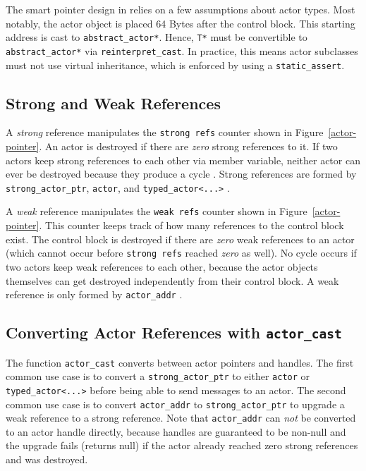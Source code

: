The smart pointer design in \lib relies on a few assumptions about actor types. Most notably, the actor object is placed 64 Bytes after the control block. This starting address is cast to \lstinline^abstract_actor*^. Hence, \lstinline^T*^ must be convertible to \lstinline^abstract_actor*^ via \lstinline^reinterpret_cast^. In practice, this means actor subclasses must not use virtual inheritance, which is enforced by using a \lstinline^static_assert^.

\subsection{Strong and Weak References}

A \emph{strong} reference manipulates the \lstinline^strong refs^ counter shown in Figure~\ref{actor-pointer}. An actor is destroyed if there are \emph{zero} strong references to it. If two actors keep strong references to each other via member variable, neither actor can ever be destroyed because they produce a cycle . Strong references are formed by \lstinline^strong_actor_ptr^, \lstinline^actor^, and \lstinline^typed_actor<...>^ .

A \emph{weak} reference manipulates the \lstinline^weak refs^ counter shown in Figure~\ref{actor-pointer}. This counter keeps track of how many references to the control block exist. The control block is destroyed if there are \emph{zero} weak references to an actor (which cannot occur before \lstinline^strong refs^ reached \emph{zero} as well). No cycle occurs if two actors keep weak references to each other, because the actor objects themselves can get destroyed independently from their control block.  A weak reference is only formed by \lstinline^actor_addr^ .

\subsection{Converting Actor References with \texttt{actor\_cast}}

The function \lstinline^actor_cast^ converts between actor pointers and handles. The first common use case is to convert a \lstinline^strong_actor_ptr^ to either \lstinline^actor^ or \lstinline^typed_actor<...>^ before being able to send messages to an actor. The second common use case is to convert \lstinline^actor_addr^ to \lstinline^strong_actor_ptr^ to upgrade a weak reference to a strong reference. Note that \lstinline^actor_addr^ can \emph{not} be converted to an actor handle directly, because handles are guaranteed to be non-null and the upgrade fails (returns null) if the actor already reached zero strong references and was destroyed.

